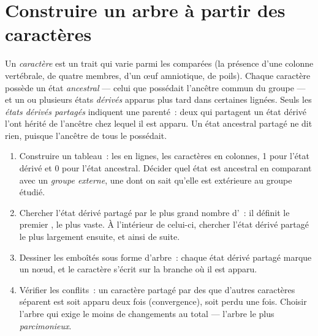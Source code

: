\section{Construire un arbre à partir des caractères}

\begin{definition}\label{def:g12:phylogenetic-trees:states}
Un \emph{caractère} est un trait qui varie parmi les  comparées
(la présence d'une colonne vertébrale, de quatre membres, d'un œuf
amniotique, de poils). Chaque caractère possède un état
\emph{ancestral} --- celui que possédait l'ancêtre commun du
groupe --- et un ou plusieurs états \emph{dérivés} apparus plus tard
dans certaines lignées. Seuls les \emph{états dérivés partagés}
indiquent une parenté~: deux  qui partagent un état dérivé
l'ont hérité de l'ancêtre chez lequel il est apparu. Un état ancestral
partagé ne dit rien, puisque l'ancêtre de tous le possédait.
\end{definition}

\begin{method}\label{met:g12:phylogenetic-trees:build}
\begin{enumerate}
  \item Construire un tableau~: les  en lignes, les caractères
        en colonnes, 1 pour l'état dérivé et 0 pour l'état ancestral.
        Décider quel état est ancestral en comparant avec un
        \emph{groupe externe}, une  dont on sait qu'elle est
        extérieure au groupe étudié.
  \item Chercher l'état dérivé partagé par le plus grand nombre
        d'~: il définit le premier , le plus vaste. À
        l'intérieur de celui-ci, chercher l'état dérivé partagé le
        plus largement ensuite, et ainsi de suite.
  \item Dessiner les  emboîtés sous forme d'arbre~: chaque état
        dérivé partagé marque un nœud, et le caractère s'écrit sur la
        branche où il est apparu.
  \item Vérifier les conflits~: un caractère partagé par des 
        que d'autres caractères séparent est soit apparu deux fois
        (convergence), soit perdu une fois. Choisir l'arbre qui exige
        le moins de changements au total --- l'arbre le plus
        \emph{parcimonieux}.
\end{enumerate}
\end{method}

